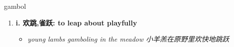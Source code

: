 
\begin{frame}
{\huge gambol}
\begin{center}
\begin{enumerate}\Large
  \item \textbf{i. 欢跳,雀跃: to leap about playfully}
  \begin{itemize}
    \item \em{\Large{young lambs gamboling in the meadow 小羊羔在原野里欢快地跳跃}}
  \end{itemize}
\end{enumerate}
\end{center}
\end{frame}
